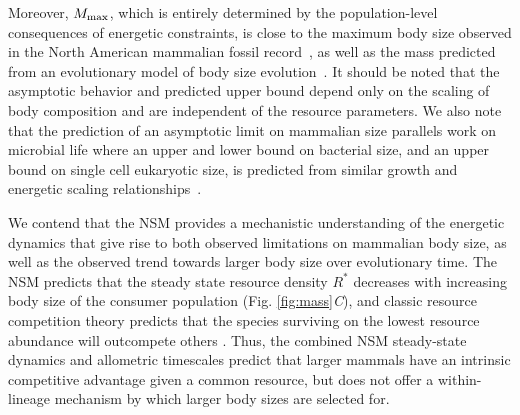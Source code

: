 \documentclass{pnastwo}
\begin{document}
\begin{article}
Moreover, $M_{\rm max}$, which is entirely determined by the population-level consequences of energetic constraints, is close to the maximum body size observed in the North American mammalian fossil record~\cite{Alroy:1998p1594}, as well as the mass predicted from an evolutionary model of body size evolution~\cite{Clauset:2009fh}.
It should be noted that the asymptotic behavior and predicted upper bound depend only on the scaling of body composition and are independent of the resource parameters.
We also note that the prediction of an asymptotic limit on mammalian size parallels work on microbial life where an upper and lower bound on bacterial size, and an upper bound on single cell eukaryotic size, is predicted from similar growth and energetic scaling relationships~\cite{Kempes:2012hy,Kempes:2016}. %






We contend that the NSM provides a mechanistic understanding of the energetic dynamics that give rise to both observed limitations on mammalian body size, as well as the observed trend towards larger body size over evolutionary time.
The NSM predicts that the steady state resource density $R^{*}$ decreases with increasing body size of the consumer population (Fig. \ref{fig:mass}\emph{C}), and classic resource competition theory predicts that the species surviving on the lowest resource abundance will outcompete others \cite{tilman1981,dutkiewicz2009,barton2010}. Thus, the combined NSM steady-state dynamics and allometric timescales predict that larger mammals have an intrinsic competitive advantage given a common resource, but does not offer a within-lineage mechanism by which larger body sizes are selected for.


\end{article}
\end{document}
